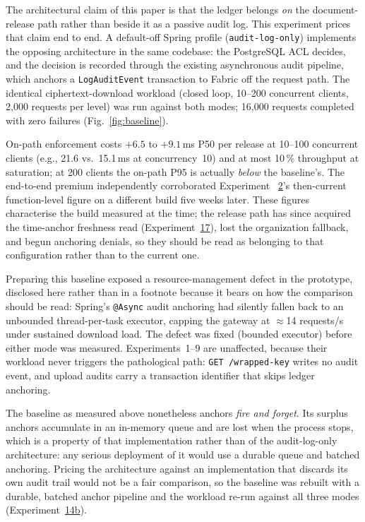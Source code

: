 \documentclass[preprint,12pt]{elsarticle}
\begin{document}
The architectural claim of this paper is that the ledger belongs
\emph{on} the document-release path rather than beside it as a passive
audit log. This experiment prices that claim end to end. A
default-off Spring profile (\texttt{audit-log-only}) implements the
opposing architecture in the same codebase: the PostgreSQL ACL decides,
and the decision is recorded through the existing asynchronous audit
pipeline, which anchors a \texttt{LogAuditEvent} transaction to Fabric
off the request path. The identical ciphertext-download workload
(closed loop, 10--200 concurrent clients, 2{,}000 requests per level)
was run against both modes; 16{,}000 requests completed with zero
failures (Fig.~\ref{fig:baseline}).

On-path enforcement costs $+6.5$ to $+9.1$\,ms P50 per release at
10--100 concurrent clients (e.g., 21.6 vs.\ 15.1\,ms at concurrency~10)
and at most 10\,\% throughput at saturation; at 200 clients the
on-path P95 is actually \emph{below} the baseline's. The end-to-end
premium independently corroborated Experiment~%
\hyperref[sec:exp_latency]{2}'s then-current function-level figure on a
different build five weeks later. These figures characterise the build
measured at the time; the release path has since acquired the time-anchor
freshness read (Experiment~\hyperref[sec:exp_timeanchor]{17}), lost the
organization fallback, and begun anchoring denials, so they should be read
as belonging to that configuration rather than to the current one.

Preparing this baseline exposed a resource-management defect in the
prototype, disclosed here rather than in a footnote because it bears on how
the comparison should be read: Spring's \texttt{@Async} audit anchoring had
silently fallen back to an unbounded thread-per-task executor, capping the
gateway at $\approx$14 requests/s under sustained download load. The defect
was fixed (bounded executor) before either mode was measured.
Experiments~1--9 are unaffected, because their workload never triggers the
pathological path: \texttt{GET /wrapped-key} writes no audit event, and
upload audits carry a transaction identifier that skips ledger anchoring.

The baseline as measured above nonetheless anchors \emph{fire and forget}.
Its surplus anchors accumulate in an in-memory queue and are lost when the
process stops, which is a property of that implementation rather than of the
audit-log-only architecture: any serious deployment of it would use a durable
queue and batched anchoring. Pricing the architecture against an
implementation that discards its own audit trail would not be a fair
comparison, so the baseline was rebuilt with a durable, batched anchor
pipeline and the workload re-run against all three modes
(Experiment~\hyperref[sec:exp_durable_baseline]{14b}).
\end{document}
